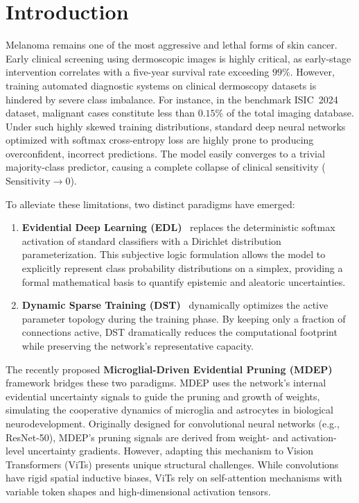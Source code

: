 \documentclass[11pt]{article}
\begin{document}
\section{Introduction}\label{sec:intro}

Melanoma remains one of the most aggressive and lethal forms of skin cancer. Early clinical screening using dermoscopic images is highly critical, as early-stage intervention correlates with a five-year survival rate exceeding $99\%$. However, training automated diagnostic systems on clinical dermoscopy datasets is hindered by severe class imbalance. For instance, in the benchmark ISIC~2024 dataset, malignant cases constitute less than $0.15\%$ of the total imaging database. Under such highly skewed training distributions, standard deep neural networks optimized with softmax cross-entropy loss are highly prone to producing overconfident, incorrect predictions. The model easily converges to a trivial majority-class predictor, causing a complete collapse of clinical sensitivity ($\text{Sensitivity} \to 0$).

To alleviate these limitations, two distinct paradigms have emerged:
\begin{enumerate}[label=(\roman*)]
    \item \textbf{Evidential Deep Learning (EDL)}~\cite{sensoy2018evidential} replaces the deterministic softmax activation of standard classifiers with a Dirichlet distribution parameterization. This subjective logic formulation allows the model to explicitly represent class probability distributions on a simplex, providing a formal mathematical basis to quantify epistemic and aleatoric uncertainties.
    \item \textbf{Dynamic Sparse Training (DST)}~\cite{evci2020rigging} dynamically optimizes the active parameter topology during the training phase. By keeping only a fraction of connections active, DST dramatically reduces the computational footprint while preserving the network's representative capacity.
\end{enumerate}

The recently proposed \textbf{Microglial-Driven Evidential Pruning (MDEP)} framework bridges these two paradigms. MDEP uses the network's internal evidential uncertainty signals to guide the pruning and growth of weights, simulating the cooperative dynamics of microglia and astrocytes in biological neurodevelopment. Originally designed for convolutional neural networks (e.g., ResNet-50), MDEP's pruning signals are derived from weight- and activation-level uncertainty gradients. However, adapting this mechanism to Vision Transformers (ViTs) presents unique structural challenges. While convolutions have rigid spatial inductive biases, ViTs rely on self-attention mechanisms with variable token shapes and high-dimensional activation tensors.
\end{document}
